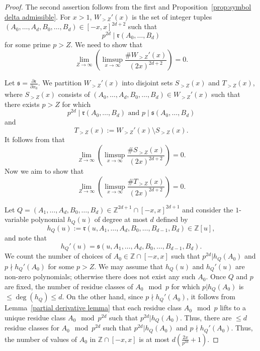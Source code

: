 \documentclass[12pt]{amsart}
\newcommand{\Z}{\mathbb{Z}}
\numberwithin{equation}{section}
\begin{document}
\begin{proof}
    The second assertion follows from the first and Proposition~\ref{prop:symbol delta admissible}.  For $x>1$, $W_{>Z}'(x)$
    is the set of integer tuples $(A_0,\ldots,A_d,B_0,\ldots,B_d)\in [-x,x]^{2d+2}$ such that 
$$p^{2d}\mid \mathfrak{r}(A_0,\ldots,B_d)$$
for some prime $p>Z$. 
    We need to show that 
    \[\lim_{Z\rightarrow \infty} \left(\limsup_{x\rightarrow \infty} \frac{\# W_{>Z}'(x)}{(2x)^{2d+2}}\right)=0.\] 
    
    Let $\displaystyle\mathfrak{s}=\frac{\partial\mathfrak{r}}{\partial x_0}$. We partition $W_{>Z}'(x)$ into disjoint sets $S_{>Z}(x)$ and $T_{>Z}(x)$, where $S_{>Z}(x)$ consists of $(A_0, \dots, A_d, B_0, \dots, B_d)\in W_{>Z}'(x)$ such that there exists $p>Z$ for which 
    \[p^{2d}\mid\mathfrak{r}(A_0, \dots, B_d)\text{ and }p\mid\mathfrak{s}(A_0, \dots, B_d)\] and 
    \[T_{>Z}(x):=W_{>Z}'(x)\setminus S_{>Z}(x).\]
    It follows from \cite[Lemma~5.1]{Poonensquarefree} that 
    \[\lim_{Z\rightarrow\infty}\left(\limsup_{x\rightarrow \infty} \frac{\# S_{>Z}(x)}{(2x)^{2d+2}}\right)=0.\]
    Now we aim to show that
    \[\lim_{Z\rightarrow \infty} \left(\limsup_{x\rightarrow \infty} \frac{\# T_{>Z}(x)}{(2x)^{2d+2}}\right)=0.\]
    
    Let $Q=(A_1, \dots, A_d, B_0, \dots, B_{d})\in \Z^{2d+1}\cap [-x, x]^{2d+1}$ and consider the $1$-variable polynomial $h_Q(u)$ of degree at most $d$ defined by 
    \[h_Q(u):=\mathfrak{r}(u, A_1, \dots, A_d, B_0, \dots , B_{d-1}, B_d)\in \Z[u],\] and note that 
    \[h_Q'(u)=\mathfrak{s}(u, A_1, \dots, A_d, B_0, \dots, B_{d-1},B_d).\]
    We count the number of choices of $A_0\in \Z\cap [-x, x]$ such that $p^{2d}| h_Q(A_0)$ and $p\nmid h_Q'(A_0)$ for some $p>Z$. We may assume that $h_Q(u)$ and $h_Q'(u)$ are non-zero polynomials; otherwise there does not exist any such $A_0$. Once $Q$ and $p$ are fixed, the number of residue classes of $A_0\mod{p}$ for which $p|h_Q(A_0)$ is $\leq \deg(h_Q)\leq d$. On the other hand, since $p\nmid h_Q'(A_0)$, it follows from Lemma~\ref{partial derivative lemma}   that each residue class $A_0\mod{p}$ lifts to a unique residue class $A_0\mod{p^{2d}}$ such that $p^{2d}|h_Q(A_0)$. Thus, there are $\leq d$ residue classes for $A_0\mod{p^{2d}}$ such that $p^{2d}|h_Q(A_0)$ and $p\nmid h_Q'(A_0)$. Thus, the number of values of $A_0$ in $\Z\cap [-x, x]$ is at most $\displaystyle d\left(\frac{2x}{p^{2d}}+1\right)$. 
    

\end{proof}
\end{document}
